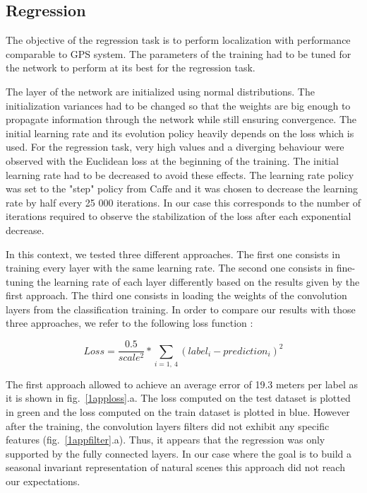 \subsection{Regression}
\label{sec:results-regression}
The objective of the regression task is to perform localization with performance comparable to GPS system. The parameters of the training had to be tuned for the network to perform at its best for the regression task.

The layer of the network are initialized using normal distributions. The initialization variances had to be changed so that the weights are big enough to propagate information through the network while still ensuring convergence.
The initial learning rate and its evolution policy heavily depends on the loss which is used. For the regression task, very high values and a diverging behaviour were observed with the Euclidean loss at the beginning of the training. The initial learning rate had to be decreased to avoid these effects. The learning rate policy was set to the "step" policy from Caffe and it was chosen to decrease the learning rate by half every 25 000 iterations. In our case this corresponds to the number of iterations required to observe the stabilization of the loss after each exponential decrease.

In this context, we tested three different approaches.  The first one consists in training every layer with the same learning rate. The second one consists in fine-tuning the learning rate of each layer differently based on the results given by the first approach. The third one consists in loading the weights of the convolution layers from the classification training. In order to compare our results with those three approaches, we refer to the following loss function :

\begin{equation} 
Loss = \frac{0.5}{scale^{2}}*\sum_{i=1,\ 4}(label_{i}-prediction_{i})^{2}
\end{equation}

The first approach allowed to achieve an average error of 19.3 meters per label as it is shown in fig.~\ref{1apploss}.a. The loss computed on the test dataset is plotted in green and the loss computed on the train dataset is plotted in blue. However after the training, the convolution layers filters did not exhibit any specific features (fig.~\ref{1appfilter}.a). Thus, it appears that the regression was only supported by the fully connected layers. In our case where the goal is to build a seasonal invariant representation of natural scenes this approach did not reach our expectations. 

